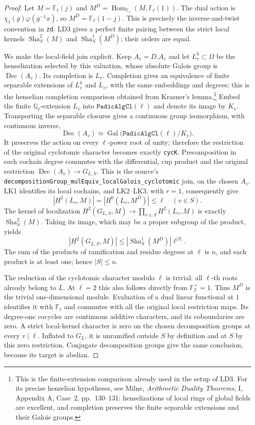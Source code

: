 \begin{proof}
Let $M=\mathbb F_\ell(j)$ and
$M^D=\operatorname{Hom}_{\mathbb F_\ell}(M,\mathbb F_\ell(1))$.
The dual action is $\chi_\ell(g)\varphi(g^{-1}x)$, so
$M^D=\mathbb F_\ell(1-j)$.  This is precisely the inverse-and-twist
convention in \texttt{zd}.  LD3 gives a perfect finite pairing
between the strict local kernels
$\operatorname{Sha}^2_S(M)$ and $\operatorname{Sha}^1_S(M^D)$;
their orders are equal.

We make the local-field join explicit.  Keep $A_v=D.A_v$ and let
$L_v^h\subset\Omega$ be the henselization selected by this
valuation, whose absolute Galois group is $\operatorname{Dec}(A_v)$.
Its completion is $L_v$.  Completion gives an equivalence of finite
separable extensions of $L_v^h$ and $L_v$, with the same embeddings
and degrees; this is the henselian completion comparison obtained
from Krasner's lemma.\footnote{This is the finite-extension
comparison already used in the setup of LD3.  For its precise
henselian hypotheses, see Milne, \emph{Arithmetic Duality Theorems},
I, Appendix A, Case~2, pp.~130--131: henselizations of local rings
of global fields are excellent, and completion preserves the
finite separable extensions and their Galois groups.}
Embed the finite $\mathbb Q_\ell$-extension $L_v$ into
$\texttt{PadicAlgCl}(\ell)$ and denote its image by $K_v$.
Transporting the separable closures gives a continuous group
isomorphism, with continuous inverse,
\[
 \operatorname{Dec}(A_v)\simeq
 \operatorname{Gal}\bigl(\texttt{PadicAlgCl}(\ell)/K_v\bigr).
\]
It preserves the action on every $\ell$-power root of unity;
therefore the restriction of the original cyclotomic character
becomes exactly \texttt{cycK}.  Precomposition in each cochain
degree commutes with the differential, cup product and the
original restriction $\operatorname{Dec}(A_v)\to G_{L,S}$.
This is the source's
\texttt{decompositionGroup\_mulEquiv\_localGalois\_cyclotomic}
join, on the chosen $A_v$.  LK1 identifies its local cochains,
and LK2--LK3, with $r=1$, consequently give
\[
 |H^2(L_v,M)|=|H^0(L_v,M^D)|\le\ell \quad(v\in S).
\]
The kernel of localization $H^2(G_{L,S},M)\to
\prod_{v\in S}H^2(L_v,M)$ is exactly
$\operatorname{Sha}^2_S(M)$.  Taking its image, which may be a
proper subgroup of the product, yields
\[
 |H^2(G_{L,S},M)|
       \le |\operatorname{Sha}^1_S(M^D)|\ell^{|S|}.
 \tag{KB.15}
\]
The sum of the products of ramification and residue degrees at
$\ell$ is $n$, and each product is at least one; hence $|S|\le n$.

The reduction of the cyclotomic character modulo $\ell$ is trivial:
all $\ell$-th roots already belong to $L$.  At $\ell=2$ this also
follows directly from $\mathbb F_2^\times=1$.
Thus $M^D$ is the trivial one-dimensional module.  Evaluation of a
dual linear functional at $1$ identifies it with $\mathbb F_\ell$
and commutes with all the original local restriction maps.
Its degree-one cocycles are continuous additive characters, and
its coboundaries are zero.  A strict local-kernel character is
zero on the chosen decomposition groups at every $v\mid\ell$.
Inflated to $G_L$, it is unramified outside $S$ by definition and
at $S$ by this zero restriction.  Conjugate decomposition groups
give the same conclusion, because its target is abelian.


\end{proof}
